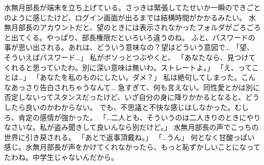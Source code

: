 水無月部長が端末を立ち上げている。さっきは緊張してたせいか一瞬のできごとのように感じたけど、ログイン画面が出るまでは結構時間がかかるみたい。
水無月部長のアカウントだと、望のときには表示されなかったフォルダがごろごろと出てくる。やっぱり、部長権限だといろいろ違うのね。
ふと、パスワードの事が思い出される。あれは、どういう意味なの？望はどういう意図で…
「望、そういえばパスワード…」
私がボソっとつぶやくと、
「あなたなら、見つけてくれると思っていたわ。別に深い意味は無いわ。ストレートよ。」
「え、ってことは…」
「あなたを私のものにしたい。ダメ？」
私は絶句してしまった。こんなあっさり告白されちゃうなんて…
急すぎて、何も言えない。同性愛とかは別に否定しないってスタンスだったけど、いざ自分の身に降りかかるとなると、どうしたら良いのかわからない。
でも、不思議と不快な感じはしなかった。むしろ、肯定の感情が強かった。
「…二人とも、そういうのは二人きりのときにやりなさいな。私が盗み聞きして良いんなら別だけど。」
水無月部長の声でこっちの世界に引き戻される。
「あとで返事頂戴ね。」
「…うん」
何となく甘酸っぱい感じ。水無月部長が声をかけてくれなかったら、もっと恥ずかしいことになってたわね。中学生じゃないんだから。

